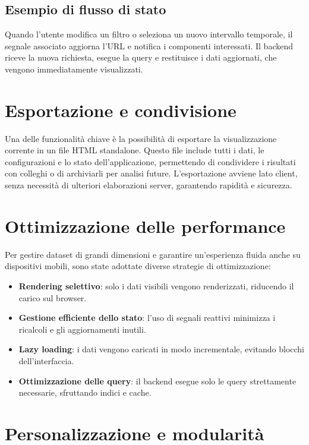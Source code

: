 \subsection{Esempio di flusso di stato}

Quando l'utente modifica un filtro o seleziona un nuovo intervallo temporale, il segnale associato aggiorna l'URL e notifica i componenti interessati. Il backend riceve la nuova richiesta, esegue la query e restituisce i dati aggiornati, che vengono immediatamente visualizzati.

\section{Esportazione e condivisione}

Una delle funzionalità chiave è la possibilità di esportare la visualizzazione corrente in un file HTML standalone. Questo file include tutti i dati, le configurazioni e lo stato dell'applicazione, permettendo di condividere i risultati con colleghi o di archiviarli per analisi future. L'esportazione avviene lato client, senza necessità di ulteriori elaborazioni server, garantendo rapidità e sicurezza.

\section{Ottimizzazione delle performance}

Per gestire dataset di grandi dimensioni e garantire un'esperienza fluida anche su dispositivi mobili, sono state adottate diverse strategie di ottimizzazione:

\begin{itemize}
    \item \textbf{Rendering selettivo}: solo i dati visibili vengono renderizzati, riducendo il carico sul browser.
    \item \textbf{Gestione efficiente dello stato}: l'uso di segnali reattivi minimizza i ricalcoli e gli aggiornamenti inutili.
    \item \textbf{Lazy loading}: i dati vengono caricati in modo incrementale, evitando blocchi dell'interfaccia.
    \item \textbf{Ottimizzazione delle query}: il backend esegue solo le query strettamente necessarie, sfruttando indici e cache.
\end{itemize}

\section{Personalizzazione e modularità}

